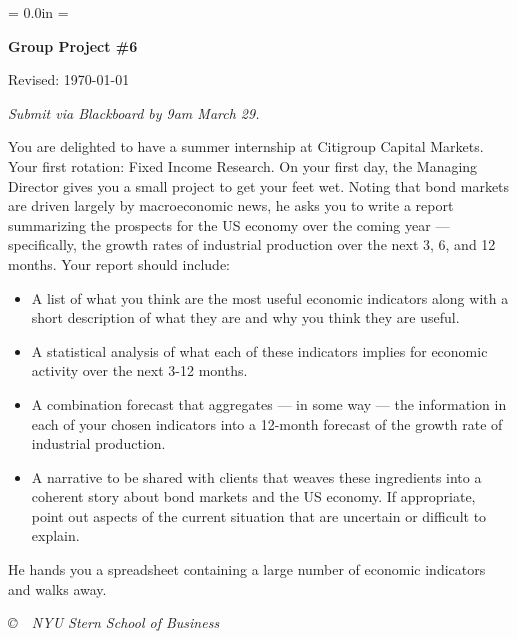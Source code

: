 \documentclass[letterpaper,12pt]{article}
\def\HeadName{Group Project \#6}
\begin{document}
\parindent = 0.0in
\parskip = \bigskipamount
\thispagestyle{empty}%
\Head

\centerline{\large \bf \HeadName}%
\centerline{Revised:  \today}

\medskip
{\it Submit via Blackboard by 9am March 29.}
\medskip

You are delighted to have a summer internship at Citigroup Capital Markets.  
Your first rotation:  Fixed Income Research.  
On your first day, the Managing Director gives you a small project to get your feet wet. 
Noting that bond markets are driven largely by macroeconomic news, 
he asks you to write a report summarizing the prospects for the US 
economy over the coming year --- specifically, 
the growth rates of industrial production over the next 3, 6, and 12 months.  
Your report should include:  
%
\begin{itemize}
\item A list of what you think are the most useful economic indicators
along with a short description of what they are and why you think they 
are useful.  

\item A statistical analysis of what each of these indicators implies  
for economic activity over the next 3-12 months.  

\item A combination forecast that aggregates  --- in some way --- 
the information in each of your chosen indicators into a 
12-month forecast of the growth rate of industrial production.  

\item A narrative to be shared with clients 
that weaves these ingredients into a coherent story 
about bond markets and the US economy.  
If appropriate, point out aspects of the current situation 
that are uncertain or difficult to explain.  
\end{itemize}
%
He hands you a spreadsheet containing a large number of 
economic indicators and walks away.  


\vfill \centerline{\it \copyright \ \number\year \ 
NYU Stern School of Business}
\end{document}
